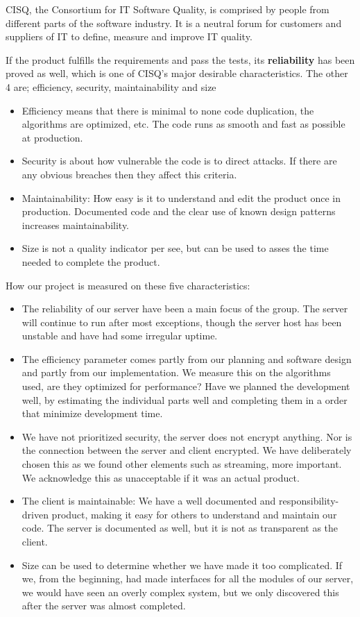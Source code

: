 CISQ, the Consortium for IT Software Quality, is comprised by people from different parts of the software industry. It is a neutral forum for customers and suppliers of IT to define, measure and improve IT quality.

If the product fulfills the requirements and pass the tests, its \textbf{reliability} has been proved as well, which is one of CISQ's  major desirable characteristics. The other 4 are; efficiency, security, maintainability and size \cite{CISQ}

\begin{itemize}
	\item Efficiency means that there is minimal to none code duplication, the algorithms are optimized, etc. The code runs as smooth and fast as possible at production.
	\item Security is about how vulnerable the code is to direct attacks. If there are any obvious breaches then they affect this criteria.
	\item Maintainability: How easy is it to understand and edit the product once in production. Documented code and the clear use of known design patterns increases maintainability. 
	\item Size is not a quality indicator per see, but can be used to asses the time needed to complete the product.
\end{itemize}

How our project is measured on these five characteristics:
\begin{itemize}
 	\item The reliability of our server have been a main focus of the group. The server will continue to run after most exceptions, though the server host has been unstable and have had some irregular uptime.
 	\item The efficiency parameter comes partly from our planning and software design and partly from our implementation. We measure this on the algorithms used, are they optimized for performance? Have we planned the development well, by estimating the individual parts well and completing them in a order that minimize development time.
 	\item We have not prioritized security, the server does not encrypt anything. Nor is the connection between the server and client encrypted. We have deliberately chosen this as we found other elements such as streaming, more important. We acknowledge this as unacceptable if it was an actual product.  
 	\item The client is maintainable: We have a well documented and responsibility-driven product, making it easy for others to understand and maintain our code. The server is documented as well, but it is not as transparent as the client.
	\item Size can be used to determine whether we have made it too complicated. If we, from the beginning, had made interfaces for all the modules of our server, we would have seen an overly complex system, but we only discovered this after the server was almost completed. 
\end{itemize}

